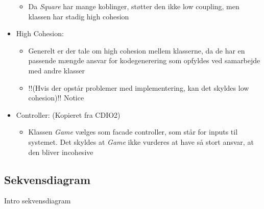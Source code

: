 \documentclass[../main.tex]{subfiles}
\begin{document}
\begin{flushleft}
\begin{itemize}
\begin{itemize}
        \item Da \textit{Square} har mange koblinger, støtter den ikke low coupling, men klassen har stadig high cohesion
    \end{itemize}
    \item High Cohesion:
    \begin{itemize}
        \item Generelt er der tale om high cohesion mellem klasserne, da de har en passende mængde ansvar for kodegenerering som opfyldes ved samarbejde med andre klasser
        \item \TODO !!(Hvis der opstår problemer med implementering, kan det skyldes low cohesion)!! Notice
    \end{itemize}
    \item Controller: (Kopieret fra CDIO2)
    \begin{itemize}
        \item Klassen \textit{Game} vælges som facade controller, som står for inputs til systemet. Det skyldes at \textit{Game} ikke vurderes at have så stort ansvar, at den bliver incohesive
    \end{itemize}
\end{itemize}
\end{flushleft}


\subsection{Sekvensdiagram }
\begin{flushleft}
\TODO Intro sekvensdiagram
\end{flushleft}

\end{document}
